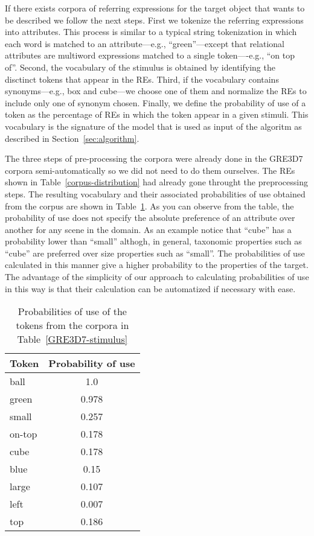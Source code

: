 If there exists corpora of referring expressions for the target object that wants to be described we follow the next steps. First we tokenize the referring expressions into attributes. This process is similar to a typical string tokenization in which each word is matched to an attribute---e.g., ``green''---except that relational attributes are multiword expressions matched to a single token----e.g., ``on top of''. Second, the vocabulary of the stimulus is obtained by identifying the disctinct tokens that appear in the REs. Third, if the vocabulary contains synonyms---e.g., box and cube---we choose one of them and normalize the REs to include only one of synonym chosen. Finally, we define the probability of use of a token as the percentage of REs in which the token appear in a given stimuli. This vocabulary is the signature of the model that is used as input of the algoritm as described in Section~\ref{sec:algorithm}.  

The three steps of pre-processing the corpora were already done in the GRE3D7 corpora semi-automatically so we did not need to do them ourselves. The REs shown in Table~\ref{corpus-distribution} had already gone throught the preprocessing steps. The resulting vocabulary and their associated probabilities of use obtained from the corpus are shown in Table~\ref{probability-of-use}. As you can observe from the table, the probability of use does not specify the absolute preference of an attribute over another for any scene in the domain. As an example notice that ``cube'' has a probability lower than ``small'' althogh, in general, taxonomic properties such as ``cube'' are preferred over size properties such as ``small''. The probabilities of use calculated in this manner give a higher probability to the properties of the target. The advantage of the simplicity of our approach to calculating probabilities of use in this way is that their calculation can be automatized if necessary with ease. 

\begin{table}
\begin{center}
\begin{tabular}{|l|c|}
\hline
Token & Probability of use \\
\hline
ball & 1.0 \\
green & 0.978 \\
small & 0.257 \\
on-top & 0.178 \\ 
cube & 0.178 \\
blue & 0.15 \\
large & 0.107 \\
left & 0.007 \\
top & 0.186 \\
\hline
\end{tabular}
\caption{Probabilities of use of the tokens from the corpora in Table~\ref{GRE3D7-stimulus}\label{probability-of-use}}
\end{center}
\end{table}

